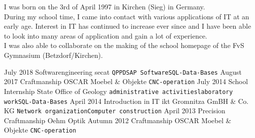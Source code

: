 \documentclass[9pt]{developercv} %
\begin{document}
\vspace{0.5cm}



\begin{minipage}[t]{0.4\textwidth} %
	\vspace{-\baselineskip} %
	
	I was born on the 3rd of April 1997 in Kirchen (Sieg) in Germany. \\
	During my school time, I came into contact with various applications of IT at an early age. Interest in IT has continued to increase ever since and I have been able to look into many areas of application and gain a lot of experience. \\
	I was also able to collaborate on the making of the school homepage of the FvS Gymnasium (Betzdorf/Kirchen). %
\end{minipage}
\hfill %
\begin{minipage}[t]{0.5\textwidth} %
	\vspace{-\baselineskip} %
	\begin{barchart}{5.5}
	\end{barchart}
\end{minipage}

\begin{center}
\end{center}



\begin{entrylist}
	\entry
		{July 2018}
		{Softwarengineering}
		{secat}
		{\texttt{QPPD}\slashsep\texttt{SAP Software}\slashsep\texttt{SQL-Data-Bases}}
	\entry
		{August 2017}
		{Craftmanship}
		{OSCAR Moebel \& Objekte}
		{\texttt{CNC-operation}}
	\entry
		{July 2014}
		{School Internship}
		{State Office of Geology}
		{\texttt{administrative activities}\slashsep\texttt{laboratory work}\slashsep\texttt{SQL-Data-Bases}}
	\entry
		{April 2014}
		{Introduction in IT}
		{ikt Gromnitza GmBH \& Co. KG}
		{\texttt{Network organization}\slashsep\texttt{Computer construction}}
	\entry
		{April 2013}
		{Precision Craftmanship}
		{Oehm Optik}
		{}
	\entry
		{Autumn 2012}
		{Craftmanship}
		{OSCAR Moebel \& Objekte}
		{\texttt{CNC-operation}}
\end{entrylist}
\end{document}
